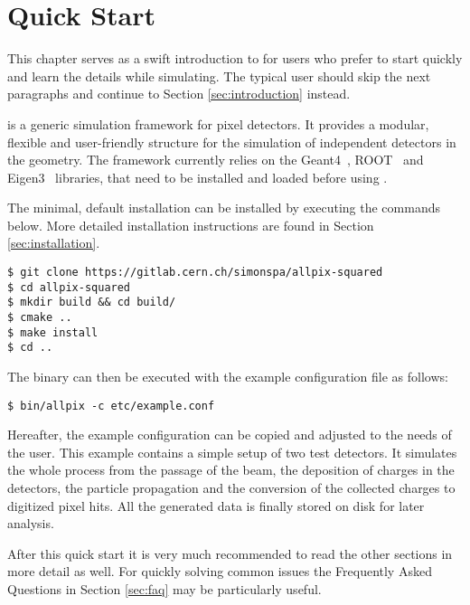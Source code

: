 \section{Quick Start}
This chapter serves as a swift introduction to \apsq for users who prefer to start quickly and learn the details while simulating. The typical user should skip the next paragraphs and continue to Section \ref{sec:introduction} instead. 

\apsq is a generic simulation framework for pixel detectors. It provides a modular, flexible and user-friendly structure for the simulation of independent detectors in the geometry. The framework currently relies on the Geant4~\cite{geant4}, ROOT~\cite{root} and Eigen3~\cite{eigen3} libraries, that need to be installed and loaded before using \apsq.

The minimal, default installation can be installed by executing the commands below. More detailed installation instructions are found in Section \ref{sec:installation}.
\begin{verbatim}
$ git clone https://gitlab.cern.ch/simonspa/allpix-squared
$ cd allpix-squared
$ mkdir build && cd build/
$ cmake ..
$ make install
$ cd ..
\end{verbatim}
The binary can then be executed with the example configuration file as follows:
\begin{verbatim}
$ bin/allpix -c etc/example.conf
\end{verbatim}

Hereafter, the example configuration can be copied and adjusted to the needs of the user. This example contains a simple setup of two test detectors. It simulates the whole process from the passage of the beam, the deposition of charges in the detectors, the particle propagation and the conversion of the collected charges to digitized pixel hits. All the generated data is finally stored on disk for later analysis.

After this quick start it is very much recommended to read the other sections in more detail as well. For quickly solving common issues the Frequently Asked Questions in Section \ref{sec:faq} may be particularly useful.
